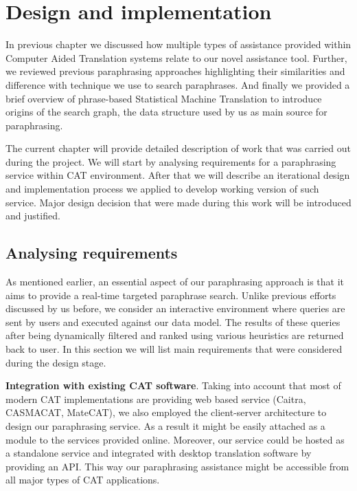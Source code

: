 \chapter{Design and implementation}

In previous chapter we discussed how multiple types of assistance provided within Computer Aided Translation systems relate to our novel assistance tool. Further, we reviewed previous paraphrasing approaches highlighting their similarities and difference with technique we use to search paraphrases. And finally we provided a brief overview of phrase-based Statistical Machine Translation to introduce origins of the search graph, the data structure used by us as main source for paraphrasing.

The current chapter will provide detailed description of work that was carried out during the project. We will start by analysing requirements for a paraphrasing service within CAT environment. After that we will describe an iterational design and implementation process we applied to develop working version of such service. Major design decision that were made during this work will be introduced and justified. 

\section{Analysing requirements}

As mentioned earlier, an essential aspect of our paraphrasing approach is that it aims to provide a real-time targeted paraphrase search. Unlike previous efforts discussed by us before, we consider an interactive environment where queries are sent by users and executed against our data model. The results of these queries after being dynamically filtered and ranked using various heuristics are returned back to user. In this section we will list main requirements that were considered during the design stage.

\textbf{Integration with existing CAT software}. Taking into account that most of modern CAT implementations are providing web based service (Caitra, CASMACAT, MateCAT), we also employed the client-server architecture to design our paraphrasing service. As a result it might be easily attached as a module to the services provided online. Moreover, our service could be hosted as a standalone service and integrated with desktop translation software by providing an API. This way our paraphrasing assistance might be accessible from all major types of CAT applications.

